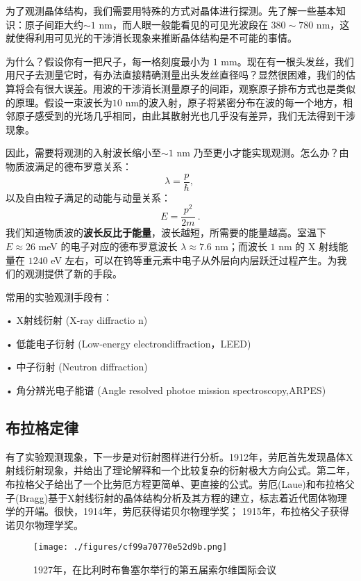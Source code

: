 
为了观测晶体结构，我们需要用特殊的方式对晶体进行探测。先了解一些基本知识：原子间距大约$\sim 1$ nm，而人眼一般能看见的可见光波段在 $380 \sim 780 $ nm，这就使得利用可见光的干涉消长现象来推断晶体结构是不可能的事情。

为什么？假设你有一把尺子，每一格刻度最小为 $1$ mm。现在有一根头发丝，我们用尺子去测量它时，有办法直接精确测量出头发丝直径吗？显然很困难，我们的估算将会有很大误差。用波的干涉消长测量原子的间距，观察原子排布方式也是类似的原理。假设一束波长为$10$ nm的波入射，原子将紧密分布在波的每一个地方，相邻原子感受到的光场几乎相同，由此其散射光也几乎没有差异，我们无法得到干涉现象。

因此，需要将观测的入射波长缩小至$\sim 1$ nm 乃至更小才能实现观测。怎么办？由物质波满足的德布罗意关系：
\begin{equation}
\lambda = \dfrac{p}{\hbar},~
\end{equation}
以及自由粒子满足的动能与动量关系：
\begin{equation}
E = \dfrac{p^2}{2 m}~.
\end{equation}
我们知道物质波的\textbf{波长反比于能量}，波长越短，所需要的能量越高。室温下 $E \approx 26 $ meV 的电子对应的德布罗意波长 $\lambda \approx  7.6 $ nm；而波长 $1$ nm 的 X 射线能量在 $1240$ eV 左右，可以在钨等重元素中电子从外层向内层跃迁过程产生。为我们的观测提供了新的手段。

常用的实验观测手段有：

• X射线衍射 (X-ray diffractio n)

• 低能电子衍射 (Low-energy electrondiffraction，LEED)

• 中子衍射 (Neutron diffraction)

• 角分辨光电子能谱 (Angle resolved photoe mission spectroscopy,ARPES)

\subsection{布拉格定律}
有了实验观测现象，下一步是对衍射图样进行分析。1912年，劳厄首先发现晶体X射线衍射现象，并给出了理论解释和一个比较复杂的衍射极大方向公式。第二年，布拉格父子给出了一个比劳厄方程更简单、更直接的公式。劳厄(Laue)和布拉格父子(Bragg)基于X射线衍射的晶体结构分析及其方程的建立，标志着近代固体物理学的开端。很快，1914年，劳厄获得诺贝尔物理学奖； 1915年，布拉格父子获得诺贝尔物理学奖。

\begin{figure}[ht]
\centering
\texttt{[image: ./figures/cf99a70770e52d9b.png]}
\caption{1927年，在比利时布鲁塞尔举行的第五届索尔维国际会议} \label{fig_RecLat_1}
\end{figure}

